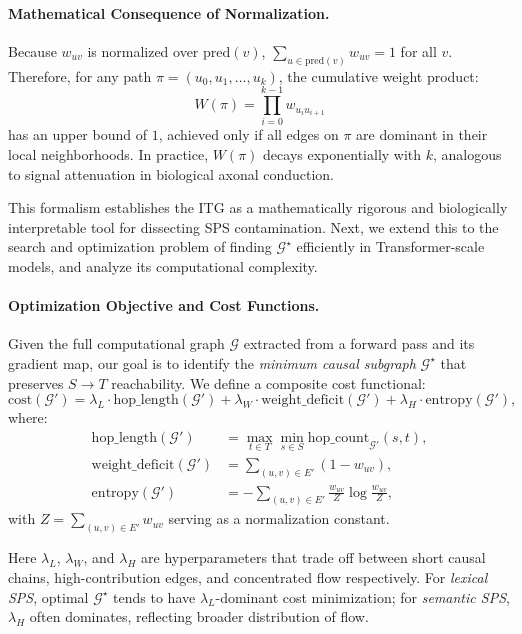 \documentclass[11pt]{article}
\begin{document}
\paragraph{Mathematical Consequence of Normalization.}
Because $w_{uv}$ is normalized over $\mathrm{pred}(v)$, $\sum_{u \in \mathrm{pred}(v)} w_{uv} = 1$ for all $v$.  
Therefore, for any path $\pi = (u_0, u_1, \dots, u_k)$, the cumulative weight product:
\[
W(\pi) = \prod_{i=0}^{k-1} w_{u_i u_{i+1}}
\]
has an upper bound of $1$, achieved only if all edges on $\pi$ are dominant in their local neighborhoods.  
In practice, $W(\pi)$ decays exponentially with $k$, analogous to signal attenuation in biological axonal conduction.

\bigskip
This formalism establishes the ITG as a mathematically rigorous and biologically interpretable tool for dissecting SPS contamination.  
Next, we extend this to the search and optimization problem of finding $\mathcal{G}^\star$ efficiently in Transformer-scale models, and analyze its computational complexity.





\paragraph{Optimization Objective and Cost Functions.}
Given the full computational graph $\mathcal{G}$ extracted from a forward pass and its gradient map, our goal is to identify the \emph{minimum causal subgraph} $\mathcal{G}^\star$ that preserves $S \to T$ reachability.  
We define a composite cost functional:
\[
\mathrm{cost}(\mathcal{G}') = \lambda_L \cdot \mathrm{hop\_length}(\mathcal{G}') 
+ \lambda_W \cdot \mathrm{weight\_deficit}(\mathcal{G}')
+ \lambda_H \cdot \mathrm{entropy}(\mathcal{G}'),
\]
where:
\begin{align*}
\mathrm{hop\_length}(\mathcal{G}') &= \max_{t \in T} \min_{s \in S} \mathrm{hop\_count}_{\mathcal{G}'}(s,t), \\
\mathrm{weight\_deficit}(\mathcal{G}') &= \sum_{(u,v) \in E'} (1 - w_{uv}), \\
\mathrm{entropy}(\mathcal{G}') &= - \sum_{(u,v) \in E'} \frac{w_{uv}}{Z} \log \frac{w_{uv}}{Z},
\end{align*}
with $Z = \sum_{(u,v) \in E'} w_{uv}$ serving as a normalization constant.

Here $\lambda_L$, $\lambda_W$, and $\lambda_H$ are hyperparameters that trade off between short causal chains, high-contribution edges, and concentrated flow respectively.  
For \textit{lexical SPS}, optimal $\mathcal{G}^\star$ tends to have $\lambda_L$-dominant cost minimization; for \textit{semantic SPS}, $\lambda_H$ often dominates, reflecting broader distribution of flow.
\end{document}
